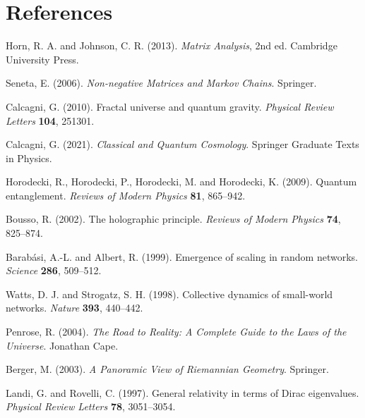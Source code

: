 \documentclass[12pt]{article}
\begin{document}
\section*{References}
\begin{enumerate}[label={[\arabic*]}, leftmargin=2em]
    \item Horn, R. A. and Johnson, C. R. (2013). \textit{Matrix Analysis}, 2nd ed. Cambridge University Press.
    \item Seneta, E. (2006). \textit{Non-negative Matrices and Markov Chains}. Springer.
    \item Calcagni, G. (2010). Fractal universe and quantum gravity. \textit{Physical Review Letters} \textbf{104}, 251301.
    \item Calcagni, G. (2021). \textit{Classical and Quantum Cosmology}. Springer Graduate Texts in Physics.
    \item Horodecki, R., Horodecki, P., Horodecki, M. and Horodecki, K. (2009). Quantum entanglement. \textit{Reviews of Modern Physics} \textbf{81}, 865--942.
    \item Bousso, R. (2002). The holographic principle. \textit{Reviews of Modern Physics} \textbf{74}, 825--874.
    \item Barab\'asi, A.-L. and Albert, R. (1999). Emergence of scaling in random networks. \textit{Science} \textbf{286}, 509--512.
    \item Watts, D. J. and Strogatz, S. H. (1998). Collective dynamics of small-world networks. \textit{Nature} \textbf{393}, 440--442.
    \item Penrose, R. (2004). \textit{The Road to Reality: A Complete Guide to the Laws of the Universe}. Jonathan Cape.
    \item Berger, M. (2003). \textit{A Panoramic View of Riemannian Geometry}. Springer.
    \item Landi, G. and Rovelli, C. (1997). General relativity in terms of Dirac eigenvalues. \textit{Physical Review Letters} \textbf{78}, 3051--3054.
\end{enumerate}
\end{document}
